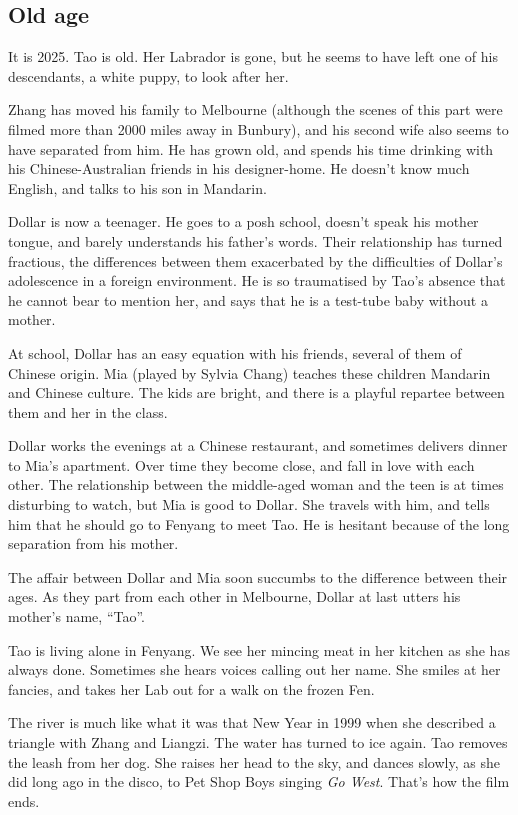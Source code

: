 \documentclass{article}
\begin{document}
\subsection{Old age}
\label{sec:7wgsj9bn}

It is 2025.  Tao is old.  Her Labrador is gone, but he seems to have
left one of his descendants, a white puppy, to look after her.

Zhang has moved his family to Melbourne (although the scenes of this
part were filmed more than 2000 miles away in Bunbury), and his second
wife also seems to have separated from him.  He has grown old, and
spends his time drinking with his Chinese-Australian friends in his
designer-home.  He doesn't know much English, and talks to his son in
Mandarin.

Dollar is now a teenager.  He goes to a posh school, doesn't speak his
mother tongue, and barely understands his father's words.  Their
relationship has turned fractious, the differences between them
exacerbated by the difficulties of Dollar's adolescence in a foreign
environment.  He is so traumatised by Tao's absence that he cannot
bear to mention her, and says that he is a test-tube baby without a
mother.

At school, Dollar has an easy equation with his friends, several of
them of Chinese origin.  Mia (played by Sylvia Chang) teaches these
children Mandarin and Chinese culture.  The kids are bright, and there
is a playful repartee between them and her in the class.

Dollar works the evenings at a Chinese restaurant, and sometimes
delivers dinner to Mia's apartment.  Over time they become close, and
fall in love with each other.  The relationship between the
middle-aged woman and the teen is at times disturbing to watch, but
Mia is good to Dollar.  She travels with him, and tells him that he
should go to Fenyang to meet Tao.  He is hesitant because of the long
separation from his mother.

The affair between Dollar and Mia soon succumbs to the difference
between their ages.  As they part from each other in Melbourne, Dollar
at last utters his mother's name, ``Tao''.

Tao is living alone in Fenyang.  We see her mincing meat in her
kitchen as she has always done.  Sometimes she hears voices calling
out her name.  She smiles at her fancies, and takes her Lab out for a
walk on the frozen Fen.

The river is much like what it was that New Year in 1999 when she
described a triangle with Zhang and Liangzi.  The water has turned to
ice again.  Tao removes the leash from her dog.  She raises her head
to the sky, and dances slowly, as she did long ago in the disco, to
Pet Shop Boys singing \emph{Go West}.  That's how the film ends.
\end{document}
